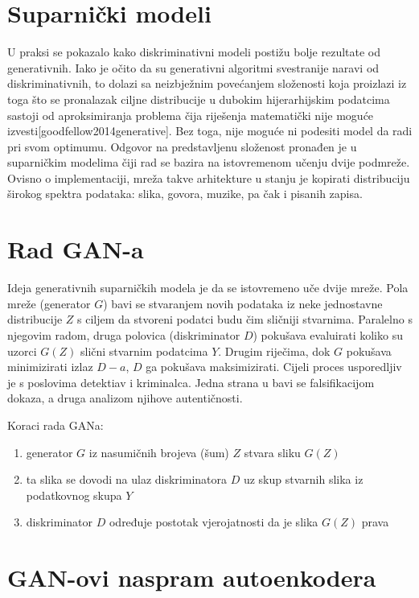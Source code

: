\documentclass[lmodern, utf8, seminar]{fer}
\begin{document}
\section{Suparnički modeli}
U praksi se pokazalo kako diskriminativni modeli postižu bolje rezultate od generativnih. Iako je očito da su generativni algoritmi svestranije naravi od diskriminativnih, to dolazi sa neizbježnim povećanjem složenosti koja proizlazi iz toga što se pronalazak ciljne distribucije u dubokim hijerarhijskim podatcima sastoji od aproksimiranja problema čija riješenja matematički nije moguće izvesti[goodfellow2014generative]. Bez toga, nije moguće ni podesiti model da radi pri svom optimumu. Odgovor na predstavljenu složenost pronađen je u suparničkim modelima čiji rad se bazira na istovremenom učenju dvije podmreže. Ovisno o implementaciji, mreža takve arhitekture u stanju je kopirati distribuciju širokog spektra podataka: slika, govora, muzike, pa čak i pisanih zapisa.
\newline

\section{Rad GAN-a}
Ideja generativnih suparničkih modela je da se istovremeno uče dvije mreže.
Pola mreže (generator $G$) bavi se stvaranjem novih podataka iz neke jednostavne distribucije $Z$ s ciljem da stvoreni podatci budu čim sličniji stvarnima. Paralelno s njegovim radom, druga polovica (diskriminator $D$) pokušava evaluirati koliko su uzorci $G(Z)$ slični stvarnim podatcima $Y$. Drugim riječima, dok $G$ pokušava minimizirati izlaz $D-a$, $D$ ga pokušava maksimizirati.
Cijeli proces usporedljiv je s poslovima detektiav i kriminalca. Jedna strana u bavi se falsifikacijom dokaza, a druga analizom njihove autentičnosti.
\newline

Koraci rada GANa:
\begin{enumerate} 
\item generator $G$ iz nasumičnih brojeva (šum) $Z$ stvara sliku $G(Z)$
\item ta slika se dovodi na ulaz diskriminatora $D$ uz skup stvarnih slika iz podatkovnog skupa $Y$
\item diskriminator $D$ određuje postotak vjerojatnosti da je slika $G(Z)$ prava
\end{enumerate}

\section{GAN-ovi naspram autoenkodera}
\end{document}
